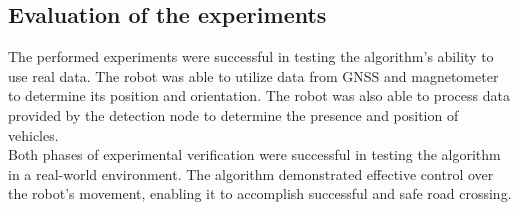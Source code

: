     \subsection{Evaluation of the experiments}
        The performed experiments were successful in testing the algorithm's ability to use real data. The robot was able to utilize data from GNSS and magnetometer to determine its position and orientation. The robot was also able to process data provided by the detection node to determine the presence and position of vehicles.\\
        Both phases of experimental verification were successful in testing the algorithm in a real-world environment. The algorithm demonstrated effective control over the robot's movement, enabling it to accomplish successful and safe road crossing.
